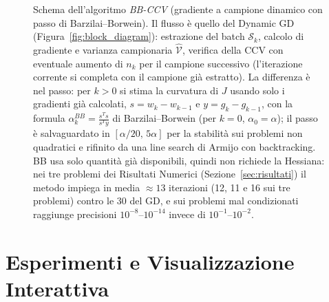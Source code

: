 \documentclass[a4paper,12pt]{article}
\numberwithin{equation}{section}
\numberwithin{figure}{section}
\numberwithin{table}{section}
\begin{document}
\begin{figure}[H]
{}
\caption{Schema dell'algoritmo \emph{BB-CCV} (gradiente a campione dinamico con
passo di Barzilai--Borwein). Il flusso è quello del Dynamic GD
(Figura~\ref{fig:block_diagram}): estrazione del batch $\mathcal{S}_k$, calcolo
di gradiente e varianza campionaria $\widehat{\mathcal{V}}$, verifica della CCV
con eventuale aumento di $n_k$ per il campione successivo (l'iterazione corrente
si completa con il campione gi\`a estratto). La differenza è nel passo: per $k > 0$ si stima
la curvatura di $J$ usando solo i gradienti già calcolati, $s = w_k - w_{k-1}$
e $y = g_k - g_{k-1}$, con la formula $\alpha_k^{BB} = \frac{s^T s}{s^T y}$ di
Barzilai--Borwein (per $k = 0$, $\alpha_0 = \alpha$); il passo è salvaguardato in
$[\alpha/20,\, 5\alpha]$ per la stabilità sui problemi non quadratici e rifinito
da una line search di Armijo con backtracking. BB usa solo quantità già
disponibili, quindi non richiede la Hessiana: nei tre problemi dei Risultati
Numerici (Sezione~\ref{sec:risultati}) il metodo impiega in media
$\approx 13$ iterazioni (12, 11 e 16 sui tre problemi) contro le 30 del GD,
e sui problemi mal condizionati raggiunge precisioni $10^{-8}$--$10^{-14}$
invece di $10^{-1}$--$10^{-2}$.}
\label{fig:bbccv}
\end{figure}

\section{Esperimenti e Visualizzazione Interattiva}\label{sec:esperimenti}
\end{document}
